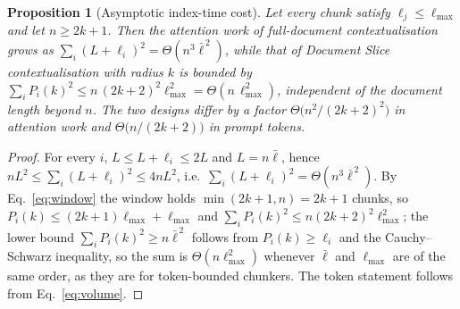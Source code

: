 \documentclass[pdflatex,sn-mathphys-num]{sn-jnl}
\theoremstyle{thmstyleone}%
\newtheorem{proposition}[theorem]{Proposition}%
\theoremstyle{thmstylethree}%
\begin{document}
\begin{proposition}[Asymptotic index-time cost]\label{prop:complexity}
Let every chunk satisfy $\ell_j\le\ell_{\max}$ and let $n\ge 2k+1$. Then the attention work of full-document contextualisation grows as $\sum_i (L+\ell_i)^2=\Theta(n^{3}\bar\ell^{\,2})$, while that of Document Slice contextualisation with radius $k$ is bounded by $\sum_i P_i(k)^2\le n\,(2k+2)^2\ell_{\max}^2=\Theta(n\,\ell_{\max}^2)$, independent of the document length beyond $n$. The two designs differ by a factor $\Theta\bigl(n^2/(2k+2)^2\bigr)$ in attention work and $\Theta\bigl(n/(2k+2)\bigr)$ in prompt tokens.
\end{proposition}
\begin{proof}
For every $i$, $L\le L+\ell_i\le 2L$ and $L=n\bar\ell$, hence $nL^2\le\sum_i(L+\ell_i)^2\le 4nL^2$, i.e.\ $\sum_i(L+\ell_i)^2=\Theta(n^3\bar\ell^{\,2})$. By Eq.~\eqref{eq:window} the window holds $\min(2k+1,n)=2k+1$ chunks, so $P_i(k)\le(2k+1)\ell_{\max}+\ell_{\max}$ and $\sum_i P_i(k)^2\le n(2k+2)^2\ell_{\max}^2$; the lower bound $\sum_i P_i(k)^2\ge n\bar\ell^{\,2}$ follows from $P_i(k)\ge\ell_i$ and the Cauchy--Schwarz inequality, so the sum is $\Theta(n\ell_{\max}^2)$ whenever $\bar\ell$ and $\ell_{\max}$ are of the same order, as they are for token-bounded chunkers. The token statement follows from Eq.~\eqref{eq:volume}.
\end{proof}
\end{document}
